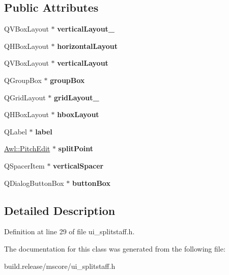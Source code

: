 \subsection*{Public Attributes}
\begin{DoxyCompactItemize}
\item 
\mbox{\label{class_ui___split_staff_a68d959b8be9ddae6f4c64dee6030ff13}} 
Q\+V\+Box\+Layout $\ast$ {\bfseries vertical\+Layout\+\_}
\item 
\mbox{\label{class_ui___split_staff_aad9696bcc2a81270fb1946bb5a6f0560}} 
Q\+H\+Box\+Layout $\ast$ {\bfseries horizontal\+Layout}
\item 
\mbox{\label{class_ui___split_staff_aa4b111bf65b4207ebbfb54f212dac502}} 
Q\+V\+Box\+Layout $\ast$ {\bfseries vertical\+Layout}
\item 
\mbox{\label{class_ui___split_staff_ab8a57438639aaa0453bc905c18232315}} 
Q\+Group\+Box $\ast$ {\bfseries group\+Box}
\item 
\mbox{\label{class_ui___split_staff_ad5763c9da18c947c3e978507ee02984a}} 
Q\+Grid\+Layout $\ast$ {\bfseries grid\+Layout\+\_}
\item 
\mbox{\label{class_ui___split_staff_ada8473b6101125a2a0cd01b07b4f3d70}} 
Q\+H\+Box\+Layout $\ast$ {\bfseries hbox\+Layout}
\item 
\mbox{\label{class_ui___split_staff_a164cfc237e4a4e3d65cd16c2525ddd5c}} 
Q\+Label $\ast$ {\bfseries label}
\item 
\mbox{\label{class_ui___split_staff_aed6f1c8042a1e44534f57a3e416c8ebc}} 
\hyperlink{class_awl_1_1_pitch_edit}{Awl\+::\+Pitch\+Edit} $\ast$ {\bfseries split\+Point}
\item 
\mbox{\label{class_ui___split_staff_a9883dd48aab96879e32affca9e3f028c}} 
Q\+Spacer\+Item $\ast$ {\bfseries vertical\+Spacer}
\item 
\mbox{\label{class_ui___split_staff_a44659366cc2c5ff71b7fd2090b6ecc06}} 
Q\+Dialog\+Button\+Box $\ast$ {\bfseries button\+Box}
\end{DoxyCompactItemize}


\subsection{Detailed Description}


Definition at line 29 of file ui\+\_\+splitstaff.\+h.



The documentation for this class was generated from the following file\+:\begin{DoxyCompactItemize}
\item 
build.\+release/mscore/ui\+\_\+splitstaff.\+h\end{DoxyCompactItemize}
